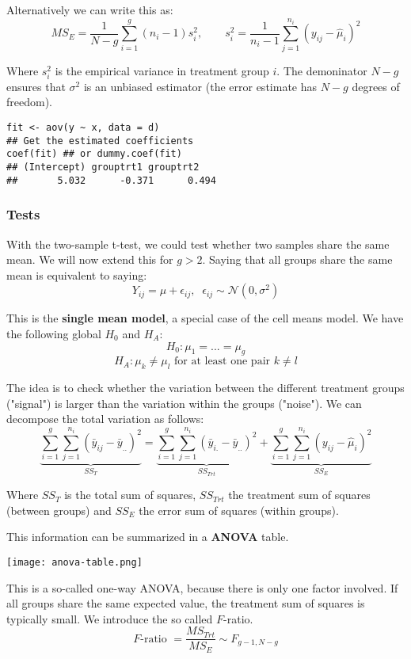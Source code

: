Alternatively we can write this as:
$$MS_E = \frac{1}{N-g} \sum_{i=1}^g (n_i - 1) s_i^2, \qquad s_i^2 = \frac{1}{n_i -1} \sum_{j=1}^{n_i}(y_{ij} - \hat \mu_i)^2$$

Where $s_i^2$ is the empirical variance in treatment group $i$. The demoninator $N - g$ ensures that $\sigma^2$ is an unbiased estimator (the error estimate has $N-g$ degrees of freedom).

\begin{lstlisting}
fit <- aov(y ~ x, data = d)
## Get the estimated coefficients
coef(fit) ## or dummy.coef(fit)
## (Intercept) grouptrt1 grouptrt2
##       5.032      -0.371      0.494
\end{lstlisting}

\subsubsection{Tests}

With the two-sample t-test, we could test whether two samples share the same mean. We will now extend this for $g > 2$. Saying that all groups share the same mean is equivalent to saying:
$$Y_{ij} = \mu + \epsilon_{ij}, \; \; \epsilon_{ij} \sim \mathcal N(0, \sigma^2)$$

This is the \textbf{single mean model}, a special case of the cell means model. We have the following global $H_0$ and $H_A$:
$$H_0 : \mu_1 = ... = \mu_g$$
$$H_A : \mu_k \neq \mu_l \text{ for at least one pair } k \neq l$$

The idea is to check whether the variation between the different treatment groups ("signal") is  larger than the variation within the groups ("noise"). We can decompose the total variation as follows:
$$\underbrace{\sum_{i=1}^g \sum_{j=1}^{n_i}(\bar y_{ij} - \bar y_{..})^2}_{SS_T} = \underbrace{\sum_{i=1}^g \sum_{j=1}^{n_i}(\bar y_{i.} - \bar y_{..})^2}_{SS_{Trt}} + \underbrace{\sum_{i=1}^g \sum_{j=1}^{n_i}(y_{ij} - \hat \mu_i)^2}_{SS_E} $$

Where $SS_T$ is the total sum of squares, $SS_{Trt}$ the treatment sum of squares (between groups) and $SS_E$ the error sum of squares (within groups).\medskip

This information can be summarized in a \textbf{ANOVA} table.
\begin{center}
	\texttt{[image: anova-table.png]}
\end{center}

This is a so-called one-way ANOVA, because there is only one factor involved. If all groups share the same expected value, the treatment sum of squares is typically small. We introduce the so called $F$-ratio.
$$F\text{-ratio } = \frac{MS_{Trt}}{MS_E} \sim F_{g-1, N-g}$$

